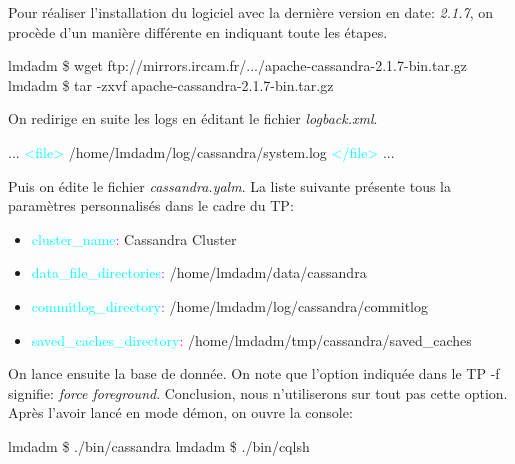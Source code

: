 \par Pour réaliser l'installation du logiciel avec la dernière version en date: \textit{2.1.7},\newline
on procède d'un manière différente en indiquant toute les étapes.\newline
\begin{tt}
lmdadm \$ wget ftp://mirrors.ircam.fr/.../apache-cassandra-2.1.7-bin.tar.gz \newline
lmdadm \$ tar -zxvf apache-cassandra-2.1.7-bin.tar.gz \newline
\end{tt}
On redirige en suite les logs en éditant le fichier \textit{logback.xml}. \newline
\begin{tt}
... \newline
\textcolor{cyan}{<file>} /home/lmdadm/log/cassandra/system.log \textcolor{cyan}{</file>} \newline
... \newline
\end{tt}
Puis on édite le fichier \textit{cassandra.yalm}. La liste suivante présente tous la paramètres personnalisés dans le cadre du TP:
\begin{itemize}
\item \textcolor{cyan}{cluster\_name}\textcolor{magenta}{:} Cassandra Cluster
\item \textcolor{cyan}{data\_file\_directories}\textcolor{magenta}{:} /home/lmdadm/data/cassandra
\item \textcolor{cyan}{commitlog\_directory}\textcolor{magenta}{:} /home/lmdadm/log/cassandra/commitlog
\item \textcolor{cyan}{saved\_caches\_directory}\textcolor{magenta}{:} /home/lmdadm/tmp/cassandra/saved\_caches
\end{itemize}
On lance ensuite la base de donnée. On note que l'option indiquée dans le TP -f
signifie: \textit{force foreground}. Conclusion, nous n'utiliserons sur tout pas cette option. Après l'avoir lancé en mode démon, on ouvre la console: \newline
\begin{tt}
lmdadm \$ ./bin/cassandra \newline
lmdadm \$ ./bin/cqlsh \newline
\end{tt}
